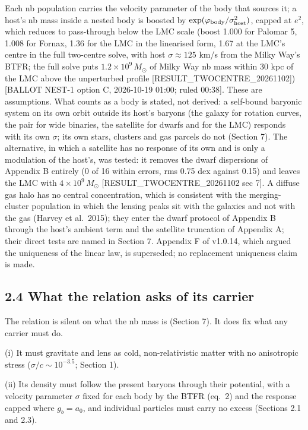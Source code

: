 \documentclass[
  10pt,
]{article}
\begin{document}
Each nb population carries the velocity parameter of the body that sources it; a host's nb mass inside a nested body is boosted by $\exp(\varphi_{\rm body}/\sigma_{\rm host}^2)$, capped at $e^2$, which reduces to pass-through below the LMC scale (boost 1.000 for Palomar 5, 1.008 for Fornax, 1.36 for the LMC in the linearised form, 1.67 at the LMC's centre in the full two-centre solve, with host $\sigma\approx125$ km/s from the Milky Way's BTFR; the full solve puts $1.2\times10^9\,M_\odot$ of Milky Way nb mass within 30 kpc of the LMC above the unperturbed profile {[}RESULT\_TWOCENTRE\_20261102{]}) {[}BALLOT NEST-1 option C, 2026-10-19 01:00; ruled 00:38{]}. These are assumptions. What counts as a body is stated, not derived: a self-bound baryonic system on its own orbit outside its host's baryons (the galaxy for rotation curves, the pair for wide binaries, the satellite for dwarfs and for the LMC) responds with its own $\sigma$; its own stars, clusters and gas parcels do not (Section 7). The alternative, in which a satellite has no response of its own and is only a modulation of the host's, was tested: it removes the dwarf dispersions of Appendix B entirely (0 of 16 within errors, rms 0.75 dex against 0.15) and leaves the LMC with $4\times10^9\,M_\odot$ {[}RESULT\_TWOCENTRE\_20261102 sec 7{]}. A diffuse gas halo has no central concentration, which is consistent with the merging-cluster population in which the lensing peaks sit with the galaxies and not with the gas (Harvey et al.~2015); they enter the dwarf protocol of Appendix B through the host's ambient term and the satellite truncation of Appendix A; their direct tests are named in Section 7. Appendix F of v1.0.14, which argued the uniqueness of the linear law, is superseded; no replacement uniqueness claim is made.

\subsection{2.4 What the relation asks of its carrier}\label{carrier}

The relation is silent on what the nb mass is (Section 7). It does fix what any carrier must do.

(i) It must gravitate and lens as cold, non-relativistic matter with no anisotropic stress ($\sigma/c\sim10^{-3.5}$; Section 1).

(ii) Its density must follow the present baryons through their potential, with a velocity parameter $\sigma$ fixed for each body by the BTFR (eq.~2) and the response capped where $g_b=a_0$, and individual particles must carry no excess (Sections 2.1 and 2.3).
\end{document}
